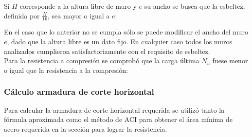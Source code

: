 Si $H$ corresponde a la altura libre de muro y $e$ su ancho se busca que la esbeltez, definida por $\frac{H}{16}$, sea mayor o igual a $e$:


En el caso que lo anterior no se cumpla sólo se puede modificar el ancho del muro $e$, dado que la altura libre es un dato fijo. En cualquier caso todos los muros analizados cumplieron satisfactoriamente con el requisito de esbeltez. \\

Para la resistencia a compresión se comprobó que la carga última $N_u$ fuese menor o igual que la resistencia a la compresión:


\subsubsection{Cálculo armadura de corte horizontal}

Para calcular la armadura de corte horizontal requerida se utilizó tanto la fórmula aproximada como el método de ACI para obtener el área mínima de acero requerida en la sección para lograr la resistencia.

